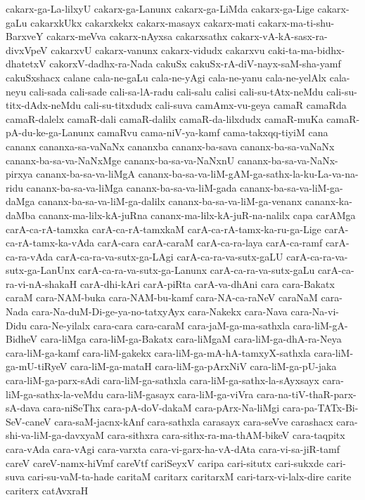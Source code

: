 {cakarx-ga-La-lilxyU
cakarx-ga-Lanunx
cakarx-ga-LiMda
cakarx-ga-Lige
cakarx-gaLu
cakarxkUkx
cakarxkekx
cakarx-masayx
cakarx-mati
cakarx-ma-ti-shu-BarxveY
cakarx-meVva
cakarx-nAyxsa
cakarxsathx
cakarx-vA-kA-sasx-ra-divxVpeV
cakarxvU
cakarx-vanunx
cakarx-vidudx
cakarxvu
caki-ta-ma-bidhx-dhatetxV
cakorxV-dadhx-ra-Nada
cakuSx
cakuSx-rA-diV-nayx-saM-sha-yamf
cakuSxshacx
calane
cala-ne-gaLu
cala-ne-yAgi
cala-ne-yanu
cala-ne-yelAlx
cala-neyu
cali-sada
cali-sade
cali-sa-lA-radu
cali-salu
calisi
cali-su-tAtx-neMdu
cali-su-titx-dAdx-neMdu
cali-su-titxdudx
cali-suva
camAmx-vu-geya
camaR
camaRda
camaR-dalelx
camaR-dali
camaR-dalilx
camaR-da-lilxdudx
camaR-muKa
camaR-pA-du-ke-ga-Lanunx
camaRvu
cama-niV-ya-kamf
cama-takxqq-tiyiM
cana
cananx
cananxa-sa-vaNaNx
cananxba
cananx-ba-sava
cananx-ba-sa-vaNaNx
cananx-ba-sa-va-NaNxMge
cananx-ba-sa-va-NaNxnU
cananx-ba-sa-va-NaNx-pirxya
cananx-ba-sa-va-liMgA
cananx-ba-sa-va-liM-gAM-ga-sathx-la-ku-La-va-na-ridu
cananx-ba-sa-va-liMga
cananx-ba-sa-va-liM-gada
cananx-ba-sa-va-liM-ga-daMga
cananx-ba-sa-va-liM-ga-dalilx
cananx-ba-sa-va-liM-ga-venanx
cananx-ka-daMba
cananx-ma-lilx-kA-juRna
cananx-ma-lilx-kA-juR-na-nalilx
capa
carAMga
carA-ca-rA-tamxka
carA-ca-rA-tamxkaM
carA-ca-rA-tamx-ka-ru-ga-Lige
carA-ca-rA-tamx-ka-vAda
carA-cara
carA-caraM
carA-ca-ra-laya
carA-ca-ramf
carA-ca-ra-vAda
carA-ca-ra-va-sutx-ga-LAgi
carA-ca-ra-va-sutx-gaLU
carA-ca-ra-va-sutx-ga-LanUnx
carA-ca-ra-va-sutx-ga-Lanunx
carA-ca-ra-va-sutx-gaLu
carA-ca-ra-vi-nA-shakaH
carA-dhi-kAri
carA-piRta
carA-va-dhAni
cara
cara-Bakatx
caraM
cara-NAM-buka
cara-NAM-bu-kamf
cara-NA-ca-raNeV
caraNaM
cara-Nada
cara-Na-duM-Di-ge-ya-no-tatxyAyx
cara-Nakekx
cara-Nava
cara-Na-vi-Didu
cara-Ne-yilalx
cara-cara
cara-caraM
cara-jaM-ga-ma-sathxla
cara-liM-gA-BidheV
cara-liMga
cara-liM-ga-Bakatx
cara-liMgaM
cara-liM-ga-dhA-ra-Neya
cara-liM-ga-kamf
cara-liM-gakekx
cara-liM-ga-mA-hA-tamxyX-sathxla
cara-liM-ga-mU-tiRyeV
cara-liM-ga-mataH
cara-liM-ga-pArxNiV
cara-liM-ga-pU-jaka
cara-liM-ga-parx-sAdi
cara-liM-ga-sathxla
cara-liM-ga-sathx-la-sAyxsayx
cara-liM-ga-sathx-la-veMdu
cara-liM-gasayx
cara-liM-ga-viVra
cara-na-tiV-thaR-parx-sA-dava
cara-niSeThx
cara-pA-doV-dakaM
cara-pArx-Na-liMgi
cara-pa-TATx-Bi-SeV-caneV
cara-saM-jacnx-kAnf
cara-sathxla
carasayx
cara-seVve
carashacx
cara-shi-va-liM-ga-davxyaM
cara-sithxra
cara-sithx-ra-ma-thAM-bikeV
cara-taqpitx
cara-vAda
cara-vAgi
cara-varxta
cara-vi-garx-ha-vA-dAta
cara-vi-sa-jiR-tamf
careV
careV-namx-hiVmf
careVtf
cariSeyxV
caripa
cari-situtx
cari-sukxde
cari-suva
cari-su-vaM-ta-hade
caritaM
caritarx
caritarxM
cari-tarx-vi-lalx-dire
carite
cariterx
catAvxraH
}
